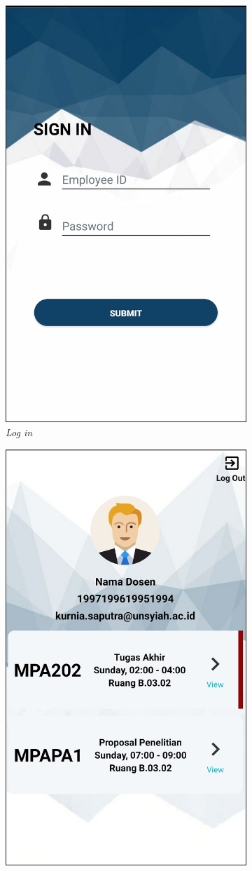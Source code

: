 \begin{enumerate}[a.]
\begin{figure} [H]
\begin{subfigure}{.5\textwidth}
			      \includegraphics[width=.5\linewidth]{gambar/android/dosen-2}
			      \caption{\textit{Log in}}
		      \end{subfigure}
		      \vspace{1cm}
		      \newline
		      \begin{subfigure}{.5\textwidth}
			      \centering
			      \includegraphics[width=.5\linewidth]{gambar/android/dosen-3}

\end{subfigure}
\end{figure}
\end{enumerate}
